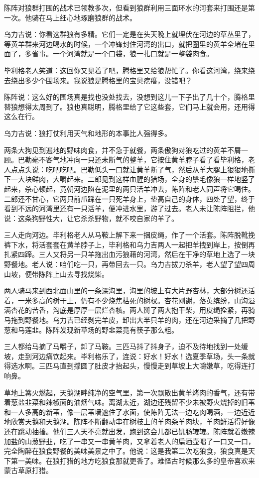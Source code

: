 \par 陈阵对狼群打围的战术已领教多次，但看到狼群利用三面环水的河套来打围还是第一次。他骑在马上细心地琢磨狼群的战术。
\par 乌力吉说：你看这群狼有多精。它们一定是在头天晚上就埋伏在河边的草丛里了，等黄羊群来河边喝水的时候，一个冲锋封住河湾的出口，就把圈里的黄羊全堵在里面了，多省事。一个河湾就是一个口袋，狼一扎口就是一整袋肉食。
\par 毕利格老人笑道：这回你又见着了吧，腾格里又给狼帮忙了。你看这河湾，绕来绕去绕出多少个围场来。我说狼是腾格里的宝贝疙瘩，没错吧？
\par 陈阵说：这么好的围场真是找也没处找去，没想到这儿一下子出了几十个，腾格里替狼想得太周到了。狼也真聪明，腾格里给了它这些套，它们马上就会用，还用得这么在行。
\par 乌力吉说：狼打仗利用天气和地形的本事比人强得多。
\par 两条大狗见到遍地的野味肉食，并不急于就餐，两条傲狗对狼吃过的黄羊不屑一顾。巴勒毫不客气地冲向一只还未断气的整羊，它按住黄羊脖子看了看毕利格，老人点点头说：吃吧吃吧。巴勒低头一口就让黄羊断了气，然后从羊大腿上狠狠地撕下一大块鲜肉，大嚼起来。二郎见到这样血腥的猎场，全身的鬃毛像狼一样地竖了起来，杀心顿起，竟朝河边陷在泥里的两只活羊冲去，陈阵和老人同声将它喝住。二郎还不甘心，它两只前爪踩在一只死羊身上，垫高自己的身体，四处了望，终于看到不远的河湾里还有一只活羊，便冲进水里，游了过去。老人未让陈阵阻拦，他说：这条狗野性大，让它杀杀野物，就不咬自家的羊了。
\par 三人走向河边。毕利格老人从马鞍上解下来一捆皮绳，作了一个活套。陈阵脱靴挽裤下水，将活套套在黄羊脖子上，毕利格和乌力吉两人一起把羊拽到岸上，按倒再扎紧四蹄。三人又将另一只羊拖出血污狼藉的河湾，然后在干净的草地上选了一块野餐地。老人说：咱们吃一只，再带回去一只。乌力吉拔刀杀羊，老人望了望四周山坡，便带陈阵上山去寻找烧柴。
\par 两人骑马来到西北面山里的一条深沟里，沟里的坡上有大片野杏林，大部分树还活着，一米多高的树干上，仍有不少烧焦枯死的树杈。杏花刚谢，落英缤纷，山沟溢满杏花的苦香，沟底是厚厚一层烂杏核。两人掰了两大抱干柴，用皮绳拴紧，再骑马拖到野餐地。乌力吉已经剥完羊皮，卸出大半只羊的肉，还在河边采摘了几把野葱和马莲韭。陈阵发现新草场的野韭菜竟有筷子那么粗。
\par 三人都给马摘了马嚼子，卸了马鞍。三匹马抖了抖身子，迫不及待地找到一处缓坡，走到河边痛饮起来。毕利格乐了，连说：好水！好水！选夏季草场，头一条就得选水啊。三匹马直到撑圆了肚皮才抬起头，慢慢走到草坡上大嚼嫩草，吃得连打响鼻。
\par 草地上篝火燃起，天鹅湖畔纯净的空气里，第一次飘散出黄羊烤肉的香气，还有带着葱盐韭菜和辣椒面的油烟气味。离湖太近，湖边还残留不少未被野火烧掉的旧苇和一人多高的新苇，像一层苇墙遮住了水面，使陈阵无法一边吃肉喝酒，一边近近地欣赏天鹅和天鹅湖。陈阵不断翻动串在树枝上的羊肉条羊肉块，羊肉鲜活得好像还在跳动抽搐。他们三人天不亮就出发，跑到这会儿都已饥肠辘辘。陈阵就着嫩辣加盐的山葱野韭，吃了一串又一串黄羊肉，又拿着老人的扁酒壶喝了一口又一口，完全陶醉在狼食野餐的美味美景之中了。他说：这是我第二次吃狼食，狼食真是天下第一美味。在狼打猎的地方吃狼食那就更香了。难怪古时候那么多的皇帝喜欢来蒙古草原打猎。
